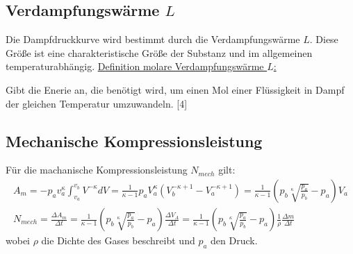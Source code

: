 \subsection*{Verdampfungswärme $L$}
Die Dampfdruckkurve wird bestimmt durch die Verdampfungswärme $L$.
Diese Größe ist eine charakteristische Größe der Substanz und im allgemeinen temperaturabhängig.
\uline{Definition molare Verdampfungswärme $L$:}
\begin{flushleft}
Gibt die Enerie an, die benötigt wird, um einen Mol einer Flüssigkeit in Dampf
der gleichen Temperatur umzuwandeln. 
\cite{Verdampfungswärme}[4]
\end{flushleft}
\subsection*{Mechanische Kompressionsleistung}
Für die machanische Kompressionsleistung $N_{mech}$ gilt:
\begin{gather}
    A_m=-p_av_a^{\kappa}\int_{v_a}^{v_b} V^{-\kappa}dV=\frac{1}{\kappa -1}p_aV_a^{\kappa}(V_b^{-\kappa +1}-V_a^{-\kappa+1})=\frac{1}{\kappa-1}(p_b\sqrt[\kappa]{\frac{p_a}{p_b}}-p_a) V_a \label{eqn:kompress} \\
    N_{mech}=\frac{\Delta A_m}{\Delta t}=\frac{1}{\kappa -1}(p_b\sqrt[\kappa]{\frac{p_a}{p_b}}-p_a)\frac{\Delta V_A}{\Delta t}=\frac{1}{\kappa -1}(p_b\sqrt[\kappa]{\frac{p_a}{p_b}}-p_a)\frac{1}{\rho}\frac{\Delta m}{\Delta t}\label{eqn:kompress2}
\end{gather}
wobei $\rho$ die Dichte des Gases beschreibt und $p_a$ den Druck.

